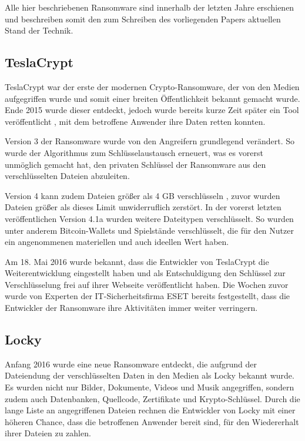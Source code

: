 Alle hier beschriebenen Ransomware sind innerhalb der letzten Jahre erschienen und beschreiben somit den zum Schreiben des vorliegenden Papers aktuellen Stand der Technik.

\subsection{TeslaCrypt}
TeslaCrypt war der erste der modernen Crypto-Ransomware, der von den Medien aufgegriffen wurde und somit einer breiten Öffentlichkeit bekannt gemacht wurde. Ende 2015 \cite{tesla:entdeckt} wurde dieser entdeckt, jedoch wurde bereits kurze Zeit später ein Tool veröffentlicht \cite{tesla:geknackt}, mit dem betroffene Anwender ihre Daten retten konnten.

Version 3 der Ransomware wurde von den Angreifern grundlegend verändert. So wurde der Algorithmus zum Schlüsselaustausch erneuert, was es vorerst unmöglich gemacht hat, den privaten Schlüssel der Ransomware aus den verschlüsselten Dateien abzuleiten. \cite{tesla:version3} \cite{tesla:version3_2}

Version 4 kann zudem Dateien größer als 4 GB verschlüsseln \cite{tesla:version4}, zuvor wurden Dateien größer als dieses Limit unwiderruflich zerstört. In der vorerst letzten veröffentlichen Version 4.1a \cite{tesla:version41} wurden weitere Dateitypen verschlüsselt. So wurden unter anderem Bitcoin-Wallets und Spielstände verschlüsselt, die für den Nutzer ein angenommenen materiellen und auch ideellen Wert haben.

Am 18. Mai 2016 wurde bekannt, dass die Entwickler von TeslaCrypt die Weiterentwicklung eingestellt haben und als Entschuldigung den Schlüssel zur Verschlüsselung frei auf ihrer Webseite veröffentlicht haben. Die Wochen zuvor wurde von Experten der IT-Sicherheitsfirma ESET bereits festgestellt, dass die Entwickler der Ransomware ihre Aktivitäten immer weiter verringern. \cite{tesla:end}

\subsection{Locky}
Anfang 2016 wurde eine neue Ransomware entdeckt, die aufgrund der Dateiendung der verschlüsselten Daten in den Medien als \glqq Locky\grqq{} bekannt wurde. Es wurden nicht nur Bilder, Dokumente, Videos und Musik angegriffen, sondern zudem auch Datenbanken, Quellcode, Zertifikate und Krypto-Schlüssel. Durch die lange Liste an angegriffenen Dateien rechnen die Entwickler von Locky mit einer höheren Chance, dass die betroffenen Anwender bereit sind, für den Wiedererhalt ihrer Dateien zu zahlen.

